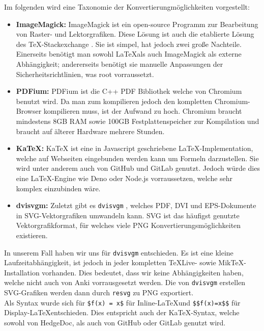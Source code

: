 \documentclass[ngerman]{article}
\begin{document}
Im folgenden wird eine Taxonomie der Konvertierungmöglichkeiten vorgestellt:
\begin{itemize}
  \item \textbf{ImageMagick:} ImageMagick \cite{ImageMagick} ist ein open-source Programm zur Bearbeitung von Raster- und Lektorgrafiken. Diese Lösung ist auch die etablierte Lösung des \TeX-Stackexchange \cite{TeXStackexchange}. Sie ist simpel, hat jedoch zwei große Nachteile. Einerseits benötigt man sowohl \LaTeX als auch ImageMagick als externe Abhängigkeit; andererseits benötigt sie manuelle Anpassungen der Sicherheitsrichtlinien, was root vorraussetzt.
  \item \textbf{PDFium:} PDFium \cite{PDFium} ist die C++ PDF Bibliothek welche von Chromium \cite{Chromium} benutzt wird. Da man zum kompilieren jedoch den kompletten Chromium-Browser kompilieren muss, ist der Aufwand zu hoch. Chromium braucht mindestens 8GB RAM sowie 100GB Festplattenspeicher zur Kompilation und braucht auf älterer Hardware mehrere Stunden.
  \item \textbf{KaTeX:} KaTeX \cite{KaTeX} ist eine in Javascript geschriebene \LaTeX-Implementation, welche auf Webseiten eingebunden werden kann um Formeln darzustellen. Sie wird unter anderem auch von GitHub und GitLab genutzt. Jedoch würde dies eine LaTeX-Engine wie Deno \cite{Deno} oder Node.js \cite{Node} vorraussetzen, welche sehr komplex einzubinden wäre.
  \item \textbf{dvisvgm:} Zuletzt gibt es \texttt{dvisvgm} \cite{dvisvgm}, welches PDF, DVI und EPS-Dokumente in SVG-Vektorgrafiken umwandeln kann. SVG ist das häufigst genutzte Vektorgrafikformat, für welches viele PNG
    Konvertierungsmöglichkeiten existieren.
\end{itemize}

In unserem Fall haben wir uns für \texttt{dvisvgm} entschieden. Es ist eine kleine Laufzeitabhängigkeit, ist jedoch in jeder kompletten TeXLive- sowie MikTeX-Installation vorhanden. Dies bedeutet, dass wir keine Abhängigkeiten haben, welche nicht auch von Anki vorrausgesetzt werden. Die von \texttt{dvisvgm} erstellen SVG-Grafiken werden dann durch \texttt{resvg} \cite{resvg} zu PNG exportiert.\\

Als Syntax wurde sich für \texttt{\$f(x) = x\$} für Inline-\LaTeX und \texttt{\$\$f(x)=x\$\$} für Display-\LaTeX entschieden. Dies entspricht auch der KaTeX-Syntax, welche sowohl von HedgeDoc, als auch von GitHub oder GitLab genutzt wird.
\end{document}
